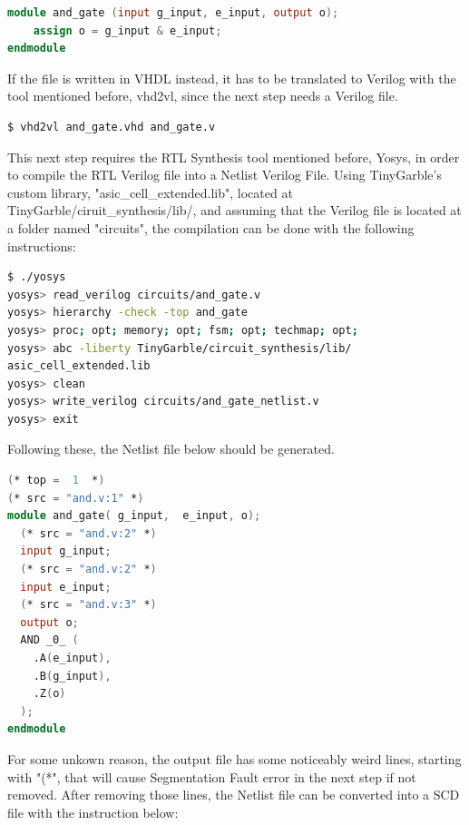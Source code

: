 \begin{refsection}
\begin{lstlisting}[caption={and\_gate.v}, language=Verilog, captionpos=b] 
module and_gate (input g_input, e_input, output o);
	assign o = g_input & e_input;
endmodule
\end{lstlisting}

If the file is written in VHDL instead, it has to be translated to Verilog with the tool mentioned before, vhd2vl, since the next step needs a Verilog file.

\begin{lstlisting}[caption={Translation of VHDL file into Verilog}, language=bash, captionpos=b] 
$ vhd2vl and_gate.vhd and_gate.v	
\end{lstlisting}

This next step requires the RTL Synthesis tool mentioned before, Yosys, in order to compile the RTL Verilog file into a Netlist Verilog File. 
Using TinyGarble's custom library, "asic\_cell\_extended.lib", located at TinyGarble/ciruit\_synthesis/lib/, and assuming that the Verilog file is located at a folder named "circuits", the compilation can be done with the following instructions:

\begin{lstlisting}[caption={Yosys instructions to compile the HDL file to a Netlist file}, language=bash, captionpos=b] 
$ ./yosys
yosys> read_verilog circuits/and_gate.v
yosys> hierarchy -check -top and_gate
yosys> proc; opt; memory; opt; fsm; opt; techmap; opt;
yosys> abc -liberty TinyGarble/circuit_synthesis/lib/
asic_cell_extended.lib
yosys> clean
yosys> write_verilog circuits/and_gate_netlist.v
yosys> exit					
\end{lstlisting}

Following these, the Netlist file below should be generated.

\begin{lstlisting}[caption={and\_gate\_netlist.v}, language=Verilog, captionpos=b] 
(* top =  1  *)
(* src = "and.v:1" *)
module and_gate( g_input,  e_input, o);
  (* src = "and.v:2" *)
  input g_input;
  (* src = "and.v:2" *)
  input e_input;
  (* src = "and.v:3" *)
  output o;
  AND _0_ (
    .A(e_input),
    .B(g_input),
    .Z(o)
  );
endmodule
\end{lstlisting}

For some unkown reason, the output file has some noticeably weird lines, starting with "(*", that will cause Segmentation Fault error in the next step if not removed.
After removing those lines, the Netlist file can be converted into a SCD file with the instruction below:


\end{refsection}
